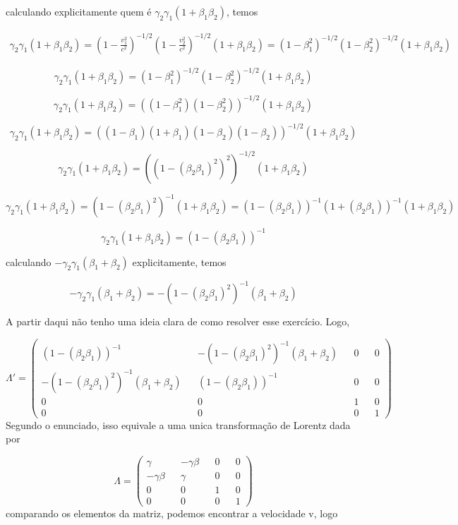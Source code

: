 \documentclass[10pt,a4paper]{article}
\begin{document}
calculando explicitamente quem é $ \gamma_2\gamma_1(1+\beta_1\beta_2) $, temos

\begin{eqnarray}
	\gamma_2\gamma_1(1+\beta_1\beta_2) = \left(1 -\frac{v_1^2}{c^2}\right)^{-1/2}\left(1 -\frac{v_2^2}{c^2}\right)^{-1/2}(1+\beta_1\beta_2) = \left(1 -\beta_1^2\right)^{-1/2}\left(1 -\beta_2^2\right)^{-1/2}(1+\beta_1\beta_2) \nonumber 
\end{eqnarray}

$$\gamma_2\gamma_1(1+\beta_1\beta_2) =\left(1 -\beta_1^2\right)^{-1/2}\left(1 -\beta_2^2\right)^{-1/2}(1+\beta_1\beta_2)$$

$$\gamma_2\gamma_1(1+\beta_1\beta_2) =\left(\left(1 -\beta_1^2\right)\left(1 -\beta_2^2\right)\right)^{-1/2}(1+\beta_1\beta_2)$$

$$\gamma_2\gamma_1(1+\beta_1\beta_2) =\left(\left(1 -\beta_1\right)\left(1 +\beta_1\right)\left(1 -\beta_2\right)\left(1 -\beta_2\right)\right)^{-1/2}(1+\beta_1\beta_2)$$

$$\gamma_2\gamma_1(1+\beta_1\beta_2) =\left((1 -(\beta_2\beta_1)^2)^2\right)^{-1/2}(1+\beta_1\beta_2)$$

$$\gamma_2\gamma_1(1+\beta_1\beta_2) =(1 -(\beta_2\beta_1)^2)^{-1}(1+\beta_1\beta_2)= (1 -(\beta_2\beta_1))^{-1}(1 +(\beta_2\beta_1))^{-1}(1+\beta_1\beta_2)$$

$$\gamma_2\gamma_1(1+\beta_1\beta_2) = (1 -(\beta_2\beta_1))^{-1}$$

calculando $-\gamma_2\gamma_1(\beta_1+\beta_2)  $ explicitamente, temos

$$-\gamma_2\gamma_1(\beta_1+\beta_2)=- (1 -(\beta_2\beta_1)^2)^{-1} (\beta_1+\beta_2)$$

A partir daqui não tenho uma ideia clara de como resolver esse exercício.
Logo,

\begin{equation}\nonumber
	\Lambda' = \left(\begin{matrix}
		(1 -(\beta_2\beta_1))^{-1}&&-(1-(\beta_2\beta_1)^2)^{-1} (\beta_1+\beta_2)&&0&&0\\
		-(1-(\beta_2\beta_1)^2)^{-1} (\beta_1+\beta_2)&&(1 -(\beta_2\beta_1))^{-1}&&0&&0\\
		0&&0&&1&&0\\
		0&&0&&0&&1
	\end{matrix}\right)
\end{equation}
Segundo o enunciado, isso equivale a uma unica transformação de Lorentz dada por

$$\Lambda = \left(\begin{matrix}
	\gamma&&-\gamma\beta&&0&&0\\
	-\gamma\beta&&\gamma&&0&&0\\
	0&&0&&1&&0\\
	0&&0&&0&&1
\end{matrix}\right)$$
comparando os elementos da matriz, podemos encontrar a velocidade v, logo
\end{document}
